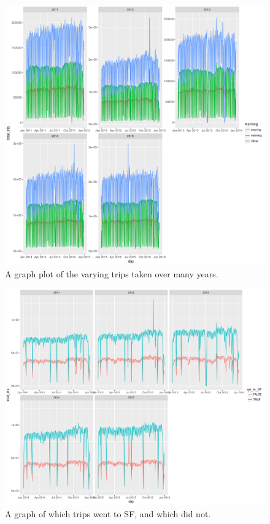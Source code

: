 \documentclass[12pt,twoside]{article}
\begin{document}
\newpage
\begin{figure} \label{figure2} 
\centerline{\includegraphics[scale=0.6]{Rplot02.pdf}}
\caption{A graph plot of the varying trips taken over many years.  }
\end{figure}
\newpage
\begin{figure} \label{figure3} 
\centerline{\includegraphics[scale=0.6]{Rplot03.pdf}}
\caption{A graph of which trips went to SF, and which did not. }
\end{figure} 
\end{document}
